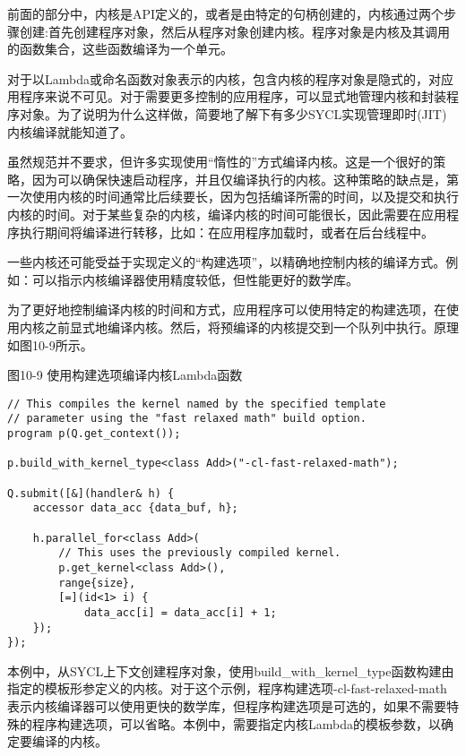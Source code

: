 前面的部分中，内核是API定义的，或者是由特定的句柄创建的，内核通过两个步骤创建:首先创建程序对象，然后从程序对象创建内核。程序对象是内核及其调用的函数集合，这些函数编译为一个单元。\par

对于以Lambda或命名函数对象表示的内核，包含内核的程序对象是隐式的，对应用程序来说不可见。对于需要更多控制的应用程序，可以显式地管理内核和封装程序对象。为了说明为什么这样做，简要地了解下有多少SYCL实现管理即时(JIT)内核编译就能知道了。\par

虽然规范并不要求，但许多实现使用“惰性的”方式编译内核。这是一个很好的策略，因为可以确保快速启动程序，并且仅编译执行的内核。这种策略的缺点是，第一次使用内核的时间通常比后续要长，因为包括编译所需的时间，以及提交和执行内核的时间。对于某些复杂的内核，编译内核的时间可能很长，因此需要在应用程序执行期间将编译进行转移，比如：在应用程序加载时，或者在后台线程中。\par

一些内核还可能受益于实现定义的“构建选项”，以精确地控制内核的编译方式。例如：可以指示内核编译器使用精度较低，但性能更好的数学库。\par

为了更好地控制编译内核的时间和方式，应用程序可以使用特定的构建选项，在使用内核之前显式地编译内核。然后，将预编译的内核提交到一个队列中执行。原理如图10-9所示。\par

\hspace*{\fill} \par %
图10-9 使用构建选项编译内核Lambda函数
\begin{lstlisting}[caption={}]
// This compiles the kernel named by the specified template
// parameter using the "fast relaxed math" build option.
program p(Q.get_context());

p.build_with_kernel_type<class Add>("-cl-fast-relaxed-math");

Q.submit([&](handler& h) {
	accessor data_acc {data_buf, h};
	
	h.parallel_for<class Add>(
		// This uses the previously compiled kernel.
		p.get_kernel<class Add>(),
		range{size},
		[=](id<1> i) {
			data_acc[i] = data_acc[i] + 1;
	});
});
\end{lstlisting}

本例中，从SYCL上下文创建程序对象，使用build\_with\_kernel\_type函数构建由指定的模板形参定义的内核。对于这个示例，程序构建选项-cl-fast-relaxed-math表示内核编译器可以使用更快的数学库，但程序构建选项是可选的，如果不需要特殊的程序构建选项，可以省略。本例中，需要指定内核Lambda的模板参数，以确定要编译的内核。\par

